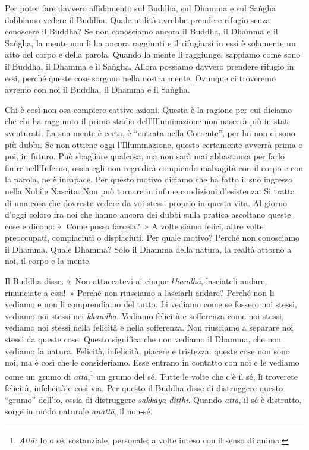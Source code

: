 Per poter fare davvero affidamento sul Buddha, sul Dhamma e sul Saṅgha
dobbiamo vedere il Buddha. Quale utilità avrebbe prendere rifugio senza
conoscere il Buddha? Se non conosciamo ancora il Buddha, il Dhamma e il
Saṅgha, la mente non li ha ancora raggiunti e il rifugiarsi in essi è
solamente un atto del corpo e della parola. Quando la mente li
raggiunge, sappiamo come sono il Buddha, il Dhamma e il Saṅgha. Allora
possiamo davvero prendere rifugio in essi, perché queste cose sorgono
nella nostra mente. Ovunque ci troveremo avremo con noi il Buddha, il
Dhamma e il Saṅgha.

Chi è così non osa compiere cattive azioni. Questa è la ragione per cui
diciamo che chi ha raggiunto il primo stadio dell'Illuminazione non
nascerà più in stati sventurati. La sua mente è certa, è ``entrata nella
Corrente'', per lui non ci sono più dubbi. Se non ottiene oggi
l'Illuminazione, questo certamente avverrà prima o poi, in futuro. Può
sbagliare qualcosa, ma non sarà mai abbastanza per farlo finire
nell'Inferno, ossia egli non regredirà compiendo malvagità con il corpo
e con la parola, ne è incapace. Per questo motivo diciamo che ha fatto
il suo ingresso nella Nobile Nascita. Non può tornare in infime
condizioni d'esistenza. Si tratta di una cosa che dovreste vedere da voi
stessi proprio in questa vita. Al giorno d'oggi coloro fra noi che hanno
ancora dei dubbi sulla pratica ascoltano queste cose e dicono: «~Come
posso farcela?~» A volte siamo felici, altre volte preoccupati,
compiaciuti o dispiaciuti. Per quale motivo? Perché non conosciamo il
Dhamma. Quale Dhamma? Solo il Dhamma della natura, la realtà attorno a
noi, il corpo e la mente.

Il Buddha disse: «~Non attaccatevi ai cinque \emph{khandhā}, lasciateli
andare, rinunciate a essi!~» Perché non riusciamo a lasciarli andare?
Perché non li vediamo e non li comprendiamo del tutto. Li vediamo come
se fossero noi stessi, vediamo noi stessi nei \emph{khandhā}. Vediamo
felicità e sofferenza come noi stessi, vediamo noi stessi nella felicità
e nella sofferenza. Non riusciamo a separare noi stessi da queste cose.
Questo significa che non vediamo il Dhamma, che non vediamo la natura.
Felicità, infelicità, piacere e tristezza: queste cose non sono noi, ma
è così che le consideriamo. Esse entrano in contatto con noi e le
vediamo come un grumo di \emph{attā},\footnote{\emph{Attā:} Io o sé,
  sostanziale, personale; a volte inteso con il senso di anima.} un
grumo del sé. Tutte le volte che c'è il sé, lì troverete felicità,
infelicità e così via. Per questo il Buddha disse di distruggere questo
``grumo'' dell'io, ossia di distruggere \emph{sakkāya-diṭṭhi}. Quando
\emph{attā}, il sé è distrutto, sorge in modo naturale \emph{anattā}, il
non-sé.

